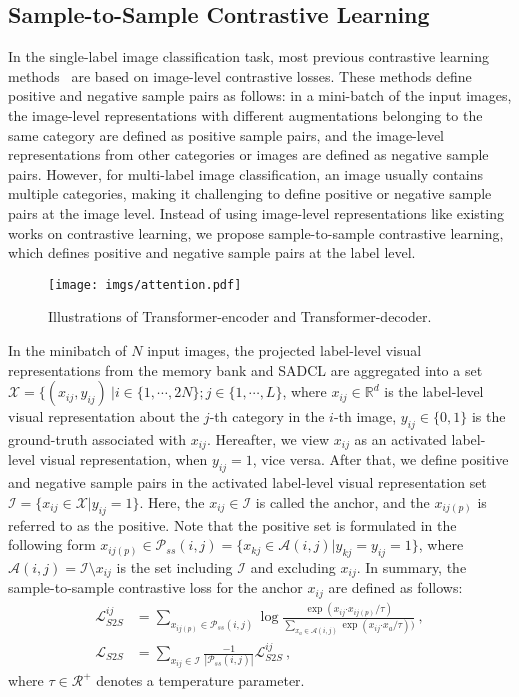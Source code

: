 \documentclass{ecai}
\newcommand{\bcdot}{\boldsymbol{\cdot}}
\begin{document}
\subsection{Sample-to-Sample Contrastive Learning}
\label{SSCL}
In the single-label image classification task, most previous contrastive learning methods~\cite{he2020momentum,khosla2020supervised} are based on image-level contrastive losses.
These methods define positive and negative sample pairs as follows: in a mini-batch of the input images, the image-level representations with different augmentations belonging to the same category are defined as positive sample pairs, and the image-level representations from other categories or images are defined as negative sample pairs.
However, for multi-label image classification, an image usually contains multiple categories, making it challenging to define positive or negative sample pairs at the image level.
Instead of using image-level representations like existing works on contrastive learning, we propose sample-to-sample contrastive learning, which defines positive and negative sample pairs at the label level.
\begin{figure}[!t]
	\begin{center}
		\texttt{[image: imgs/attention.pdf]}
		\caption{Illustrations of Transformer-encoder and Transformer-decoder.
		}\label{fig3}
	\end{center}
\end{figure}
In the minibatch of $N$ input images, the projected label-level visual representations from the memory bank and SADCL are aggregated into a set $\mathcal{X}=\{(x_{ij},y_{ij})\ \vert i \in \{1, \cdots, 2N\}; j \in \{1, \cdots, L\}$, where $x_{ij} \in \mathbb{R}^{d}$ is the label-level visual representation about the $j$-th category in the $i$-th image, $y_{ij} \in \{0,1\}$ is the ground-truth associated with $x_{ij}$.
Hereafter, we view $x_{ij}$ as an activated label-level visual representation, when $y_{ij}=1$, vice versa.
After that, we define positive and negative sample pairs in the activated label-level visual representation set $\mathcal{I} = \{x_{ij} \in \mathcal{X} | y_{ij} = 1\}$.
Here, the $x_{ij} \in \mathcal{I}$ is called the anchor, and the $x_{ij(p)}$ is referred to as the positive.
Note that the positive set is formulated in the following form $x_{ij(p)} \in \mathcal{P}_{ss}(i,j) = {\{x_{kj} \in \mathcal{A}(i,j)| y_{kj} = y_{ij} = 1\}}$, where $\mathcal{A}(i,j) = \mathcal{I} \setminus x_{ij}$ is the set including $\mathcal{I}$ and excluding $x_{ij}$.
In summary, the sample-to-sample contrastive loss for the anchor $x_{ij}$ are defined as follows:
\begin{equation}
	\begin{split}
		\mathcal{L}_{S2S}^{ij}&=\sum\limits_{x_{ij(p)} \!\in \mathcal{P}_{ss}(i,j)}\!
		\log\frac{\exp(x_{ij} \! \bcdot \! x_{ij(p)}/\tau)}{\sum_{x_a \! \in \mathcal{A}(i,j)} \! \exp(x_{ij} \! \bcdot \! x_a/\tau))}~,\\
		\mathcal{L}_{S2S} &= \sum_{x_{ij} \in \mathcal{I}} \frac{-1}{|\mathcal{P}_{ss}(i,j)|} \mathcal{L}_{S2S}^{ij}~,
	\end{split}
\end{equation}
where $\tau \in \mathcal{R}^{+}$ denotes a temperature parameter.
\end{document}
